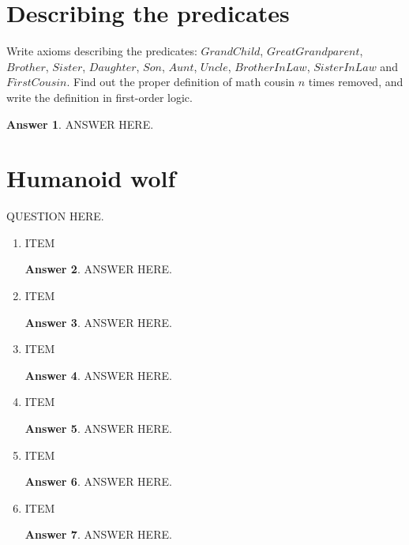 \documentclass[a4paper]{article}
\renewcommand{\(}{\left(}
\renewcommand{\)}{\right)}
\theoremstyle{plain}
\theoremstyle{plain}
\theoremstyle{definition}
\newtheorem*{answer}{Answer}
\begin{document}
\section{Describing the predicates}
Write axioms describing the predicates: $GrandChild$, $GreatGrandparent$, $Brother$, $Sister$, $Daughter$, $Son$, $Aunt$, $Uncle$, $BrotherInLaw$, $SisterInLaw$ and $FirstCousin$. Find out the proper definition of math cousin $n$ times removed, and write the definition in first-order logic.
\begin{shaded}
\begin{answer}
ANSWER HERE.
\end{answer}
\end{shaded}

\section{Humanoid wolf}
QUESTION HERE.
\begin{enumerate}[label*=\roman*.,ref=\roman*]

\item ITEM
\begin{shaded}
\begin{answer}
ANSWER HERE.
\end{answer}
\end{shaded}

\item ITEM
\begin{shaded}
\begin{answer}
ANSWER HERE.
\end{answer}
\end{shaded}

\item ITEM
\begin{shaded}
\begin{answer}
ANSWER HERE.
\end{answer}
\end{shaded}

\item ITEM
\begin{shaded}
\begin{answer}
ANSWER HERE.
\end{answer}
\end{shaded}

\item ITEM
\begin{shaded}
\begin{answer}
ANSWER HERE.
\end{answer}
\end{shaded}

\item ITEM
\begin{shaded}
\begin{answer}
ANSWER HERE.
\end{answer}
\end{shaded}

\end{enumerate}
\end{document}
